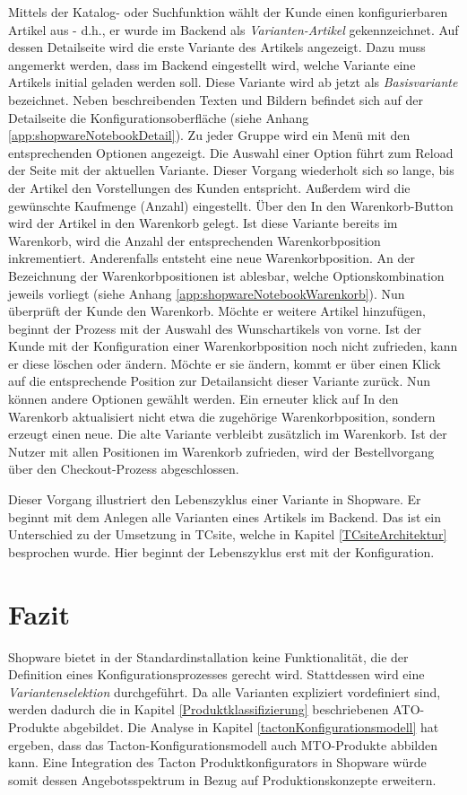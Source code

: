 \documentclass[11pt, a4paper, titlepage, listof=totoc, bibliography=totoc, index=totoc, twoside, openright, headings=normal]{scrreprt}
\begin{document}
Mittels der Katalog- oder Suchfunktion wählt der Kunde einen konfigurierbaren Artikel aus - d.h., er wurde im Backend als \emph{Varianten-Artikel} gekennzeichnet. Auf dessen Detailseite wird die erste Variante des Artikels angezeigt. Dazu muss angemerkt werden, dass im Backend eingestellt wird, welche Variante eine Artikels initial geladen werden soll. Diese Variante wird ab jetzt als \emph{Basisvariante} bezeichnet. Neben beschreibenden Texten und Bildern befindet sich auf der Detailseite die Konfigurationsoberfläche (siehe Anhang \ref{app:shopwareNotebookDetail}). Zu jeder Gruppe wird ein Menü mit den entsprechenden Optionen angezeigt. Die Auswahl einer Option führt zum Reload der Seite mit der aktuellen Variante. Dieser Vorgang wiederholt sich so lange, bis der Artikel den Vorstellungen des Kunden entspricht. Außerdem wird die gewünschte Kaufmenge (Anzahl) eingestellt. Über den \glqq In den Warenkorb\grqq{}-Button wird der Artikel in den Warenkorb gelegt. Ist diese Variante bereits im Warenkorb, wird die Anzahl der entsprechenden Warenkorbposition inkrementiert. Anderenfalls entsteht eine neue Warenkorbposition. An der Bezeichnung der Warenkorbpositionen ist ablesbar, welche Optionskombination jeweils vorliegt (siehe Anhang \ref{app:shopwareNotebookWarenkorb}). Nun überprüft der Kunde den Warenkorb. Möchte er weitere Artikel hinzufügen, beginnt der Prozess mit der Auswahl des Wunschartikels von vorne. Ist der Kunde mit der Konfiguration einer Warenkorbposition noch nicht zufrieden, kann er diese löschen oder ändern. Möchte er sie ändern, kommt er über einen Klick auf die entsprechende Position zur Detailansicht dieser Variante zurück. Nun können andere Optionen gewählt werden. Ein erneuter klick auf \glqq In den Warenkorb\grqq{} aktualisiert nicht etwa die zugehörige Warenkorbposition, sondern erzeugt einen neue. Die alte Variante verbleibt zusätzlich im Warenkorb. Ist der Nutzer mit allen Positionen im Warenkorb zufrieden, wird der Bestellvorgang über den Checkout-Prozess abgeschlossen.

Dieser Vorgang illustriert den Lebenszyklus einer Variante in Shopware. Er beginnt mit dem Anlegen alle Varianten eines Artikels im Backend. Das ist ein Unterschied zu der Umsetzung in TCsite, welche in Kapitel \ref{TCsiteArchitektur}
 besprochen wurde. Hier beginnt der Lebenszyklus erst mit der Konfiguration.

\section{Fazit}
\label{analyseFazit}
Shopware bietet in der Standardinstallation keine Funktionalität, die der Definition eines Konfigurationsprozesses gerecht wird. Stattdessen wird eine \emph{Variantenselektion} durchgeführt. Da alle Varianten expliziert vordefiniert sind, werden dadurch die in Kapitel \ref{Produktklassifizierung} beschriebenen \ac{ATO}-Produkte abgebildet. Die Analyse in Kapitel \ref{tactonKonfigurationsmodell} hat ergeben, dass das Tacton-Konfigurationsmodell auch \ac{MTO}-Produkte abbilden kann. Eine Integration des Tacton Produktkonfigurators in Shopware würde somit dessen Angebotsspektrum in Bezug auf Produktionskonzepte erweitern.
\end{document}
